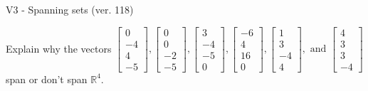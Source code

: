 \begin{exercise}
  \begin{exerciseTitle}V3 - Spanning sets (ver. 118)\end{exerciseTitle}
  \begin{exerciseStatement}
    Explain why the vectors \(\left[\begin{array}{r}
0 \\
-4 \\
4 \\
-5
\end{array}\right] , \left[\begin{array}{r}
0 \\
0 \\
-2 \\
-5
\end{array}\right] , \left[\begin{array}{r}
3 \\
-4 \\
-5 \\
0
\end{array}\right] , \left[\begin{array}{r}
-6 \\
4 \\
16 \\
0
\end{array}\right] , \left[\begin{array}{r}
1 \\
3 \\
-4 \\
4
\end{array}\right] , \text{ and } \left[\begin{array}{r}
4 \\
3 \\
3 \\
-4
\end{array}\right]\) span or don't span \(\mathbb{R}^4\). 
	



\end{exerciseStatement}
\end{exercise}
